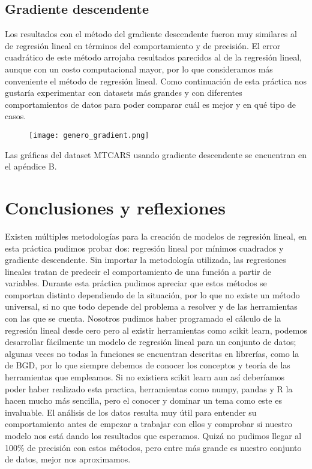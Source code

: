 \documentclass[sigconf,authorversion,nonacm]{acmart}
\begin{document}
\subsection{Gradiente descendente}
Los resultados con el método del gradiente descendente fueron muy similares al de regresión lineal en términos del comportamiento y de precisión.
El error cuadrático de este método arrojaba resultados parecidos al de la regresión lineal, aunque con un costo computacional mayor, por lo que consideramos más conveniente el método de regresión lineal. Como continuación de esta práctica nos gustaría experimentar con datasets más grandes y con diferentes comportamientos de datos para poder comparar cuál es mejor y en qué tipo de casos.

\begin{figure}[H]
  \centering
  \texttt{[image: genero\_gradient.png]}
\end{figure}

Las gráficas del dataset MTCARS usando gradiente descendente se encuentran en el apéndice B.


\section{Conclusiones y reflexiones}
Existen múltiples metodologías para la creación de modelos de regresión lineal, en esta práctica pudimos probar dos: regresión lineal por mínimos cuadrados y gradiente descendente. Sin importar la metodología utilizada, las regresiones lineales tratan de predecir el comportamiento de una función a partir de variables. Durante esta práctica pudimos apreciar que estos métodos se comportan distinto dependiendo de la situación, por lo que no existe un método universal, si no que todo depende del problema a resolver y de las herramientas con las que se cuenta.
Nosotros pudimos haber programado el cálculo de la regresión lineal desde cero pero al existir herramientas como scikit learn, podemos desarrollar fácilmente un modelo de regresión lineal para un conjunto de datos; algunas veces no todas la funciones se encuentran descritas en librerías, como la de BGD, por lo que siempre debemos de conocer los conceptos y teoría de las herramientas que empleamos. Si no existiera scikit learn aun así deberíamos poder haber realizado esta practica, herramientas como numpy, pandas y R la hacen mucho más sencilla, pero el conocer y dominar un tema como este es invaluable.
El análisis de los datos resulta muy útil para entender su comportamiento antes de empezar a trabajar con ellos y comprobar si nuestro modelo nos está dando los resultados que esperamos.
Quizá no pudimos llegar al 100\% de precisión con estos métodos, pero entre más grande es nuestro conjunto de datos, mejor nos aproximamos.
\end{document}
